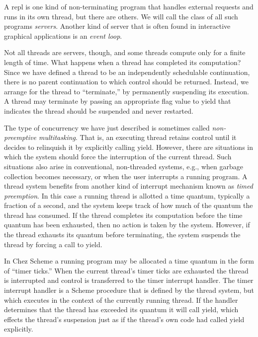\documentclass{article}
\begin{document}
A {\sc repl} is one kind of non-terminating program that handles external
requests and runs in its own thread, but there are others.  We will
call the class of all such programs {\em servers}.  Another kind of
server that is often found in interactive graphical applications is an
{\em event loop}.

Not all threads are servers, though, and some threads compute only for
a finite length of time.  What happens when a thread has completed its
computation?  Since we have defined a thread to be an independently
schedulable continuation, there is no parent continuation to which
control should be returned.  Instead, we arrange for the thread to
``terminate,'' by permanently suspending its execution.  A thread may
terminate by passing an appropriate flag value to {\sf yield} that
indicates the thread should be suspended and never restarted.

The type of concurrency we have just described is sometimes called
{\em non-preemptive multitasking}. That is, an executing thread
retains control until it decides to relinquish it by explicitly
calling {\sf yield}.  However, there are situations in which the
system should force the interruption of the current thread.  Such
situations also arise in conventional, non-threaded systems, e.g.,
when garbage collection becomes necessary, or when the user interrupts
a running program.  A thread system benefits from another kind of
interrupt mechanism known as {\em timed preemption}.  In this case a
running thread is allotted a time quantum, typically a fraction of a
second, and the system keeps track of how much of the quantum the
thread has consumed.  If the thread completes its computation before
the time quantum has been exhausted, then no action is taken by the
system.  However, if the thread exhausts its quantum before
terminating, the system suspends the thread by forcing a call to {\sf
yield}.

In Chez Scheme a running program may be allocated a time quantum in
the form of ``timer ticks.''  When the current thread's timer ticks
are exhausted the thread is interrupted and control is transferred to
the timer interrupt handler.  The timer interrupt handler is a Scheme
procedure that is defined by the thread system, but which executes in
the context of the currently running thread.  If the handler
determines that the thread has exceeded its quantum it will call {\sf
yield}, which effects the thread's suspension just as if the thread's
own code had called {\sf yield} explicitly.
\end{document}
